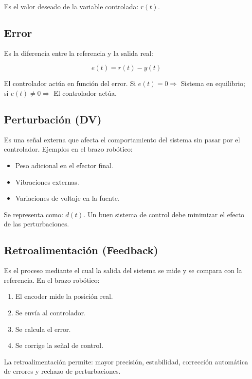 \documentclass[11pt]{article}
\begin{document}
Es el valor deseado de la variable controlada: $r(t)$.

\subsection{Error}

Es la diferencia entre la referencia y la salida real:

\begin{equation}
	e(t) = r(t) - y(t)
\end{equation}

El controlador actúa en función del error. Si $e(t) = 0 \Rightarrow$ Sistema en equilibrio; si $e(t) \neq 0 \Rightarrow$ El controlador actúa.

\subsection{Perturbación (DV)}

Es una señal externa que afecta el comportamiento del sistema sin pasar por el controlador. Ejemplos en el brazo robótico:

\begin{itemize}
	\item Peso adicional en el efector final.
	\item Vibraciones externas.
	\item Variaciones de voltaje en la fuente.
\end{itemize}

Se representa como: $d(t)$. Un buen sistema de control debe minimizar el efecto de las perturbaciones.

\subsection{Retroalimentación (Feedback)}

Es el proceso mediante el cual la salida del sistema se mide y se compara con la referencia. En el brazo robótico:

\begin{enumerate}
	\item El encoder mide la posición real.
	\item Se envía al controlador.
	\item Se calcula el error.
	\item Se corrige la señal de control.
\end{enumerate}

La retroalimentación permite: mayor precisión, estabilidad, corrección automática de errores y rechazo de perturbaciones.
\end{document}
